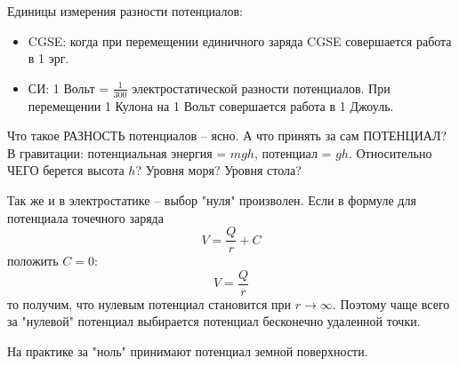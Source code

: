 Единицы измерения разности потенциалов:
\begin{itemize}
\item CGSE: когда при перемещении единичного заряда CGSE совершается работа в 1 эрг.
\item СИ: 1 Вольт = $\frac1{300}$ электростатической разности потенциалов. При пе\-ре\-ме\-ще\-нии 1 Кулона на 1 Вольт совершается работа в 1 Джоуль.
\end{itemize}

Что такое РАЗНОСТЬ потенциалов -- ясно. А что принять за сам ПО\-ТЕН\-ЦИАЛ?  В гравитации: потенциальная энергия = $mgh$,  потенциал = $gh$. Относительно ЧЕГО берется высота $h$? Уровня моря? Уровня стола?

Так же и в электростатике -- выбор "нуля" произволен. Если в формуле для потенциала точечного заряда
\begin{displaymath}
V=\frac Qr+C
\end{displaymath}
положить $C=0$:
\begin{displaymath}
V=\frac Qr
\end{displaymath}
то получим, что нулевым  потенциал становится при $r\rightarrow\infty$. Поэтому чаще всего за "нулевой" потенциал выбирается потенциал бесконечно удаленной точки.
 \begin{center}
 \end{center}

На практике за "ноль" принимают потенциал земной поверхности.


